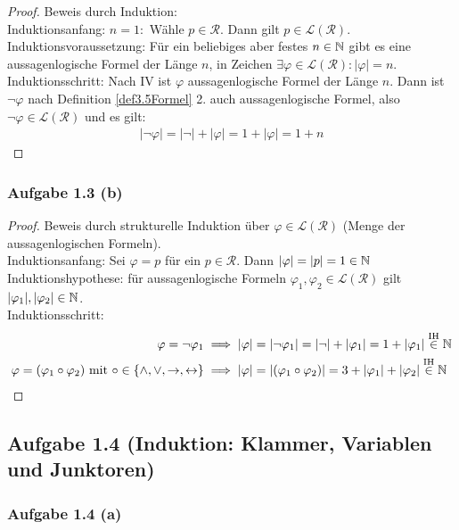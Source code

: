 \begin{proof}
	Beweis durch Induktion:\\
	Induktionsanfang: $n=1:$ Wähle $p\in\mathcal{R}$. 
	Dann gilt $p\in\mathcal{L}(\mathcal{R})$.\\
	Induktionsvoraussetzung: Für ein beliebiges aber festes $n\in\mathbb{N}$ gibt es eine aussagenlogische Formel der Länge $n$, in Zeichen 
	$\exists\varphi\in\mathcal{L}(\mathcal{R}):|\varphi|=n$.\\
	Induktionsschritt: Nach IV ist $\varphi$ aussagenlogische Formel der Länge $n$. 
	Dann ist $\neg\varphi$ nach Definition \ref{def3.5Formel} 2. auch aussagenlogische Formel, also 
	$\neg\varphi\in\mathcal{L}(\mathcal{R})$ und es gilt:
	\begin{align*}
		|\neg\varphi|=|\neg|+|\varphi|=1+|\varphi|=1+n	
	\end{align*}
\end{proof}

\subsubsection{Aufgabe 1.3 (b)}
\begin{proof}
	Beweis durch strukturelle Induktion über $\varphi\in\mathcal{L}(\mathcal{R})$ (Menge der aussagenlogischen Formeln).\\
	Induktionsanfang: Sei $\varphi=p$ für ein $p\in\mathcal{R}$. Dann $|\varphi|=|p|=1\in\mathbb{N}$\\
	Induktionshypothese: für aussagenlogische Formeln $\varphi_1,\varphi_2\in\mathcal{L}(\mathcal{R})$ gilt $|\varphi_1|,|\varphi_2|\in\mathbb{N}$.\\
	Induktionsschritt: 
	\begin{align*}
		\varphi=\neg\varphi_1&\implies|\varphi|=|\neg\varphi_1|=|\neg|+|\varphi_1|=1+|\varphi_1|\stackrel{\text{IH}}{\in}\mathbb{N}\\
		\varphi=(\varphi_1\circ\varphi_2)\text{ mit }\circ\in\lbrace\wedge,\vee,\to,\leftrightarrow\rbrace&\implies|\varphi|=|(\varphi_1\circ\varphi_2)|=3+|\varphi_1|+|\varphi_2|\stackrel{\text{IH}}{\in}\mathbb{N}
	\end{align*}
\end{proof}

\subsection{Aufgabe 1.4 (Induktion: Klammer, Variablen und Junktoren)}

\subsubsection{Aufgabe 1.4 (a)}

